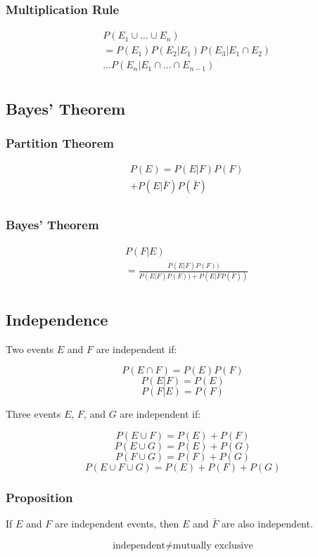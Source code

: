 \subsubsection*{Multiplication Rule}

\begin{align*}
     & P(E_1 \cup \dots \cup E_n)               \\
     & = P(E_1)P(E_2|E_1)P(E_3|E_1 \cap E_2)    \\
     & \dots P(E_n|E_1 \cap \dots \cap E_{n-1}) \\
\end{align*}

\subsection*{Bayes' Theorem}

\subsubsection*{Partition Theorem}

\begin{align*}
     & P(E) = P(E|F)P(F)        \\
     & + P(E|\bar{F})P(\bar{F}) \\
\end{align*}

\subsubsection*{Bayes' Theorem}

\begin{align*}
     & P(F|E)                                                     \\
     & = \frac{P(E|F)P(F))}{P(E|F)P(F)) + P(E|\bar{F}P(\bar{F}))} \\
\end{align*}

\subsection*{Independence}

Two events $E$ and $F$ are independent if:

$$ P(E \cap F) = P(E)P(F) $$
$$ P(E|F) = P(E) $$
$$ P(F|E) = P(F) $$

Three events $E$, $F$, and $G$ are independent if:

$$ P(E \cup F) = P(E) + P(F) $$
$$ P(E \cup G) = P(E) + P(G) $$
$$ P(F \cup G) = P(F) + P(G) $$
$$ P(E \cup F \cup G) = P(E) + P(F) + P(G) $$

\subsubsection*{Proposition}

If $E$ and $F$ are independent events, then $E$ and $\bar{F}$ are also independent.

$$ \text{independent} \neq \text{mutually exclusive} $$